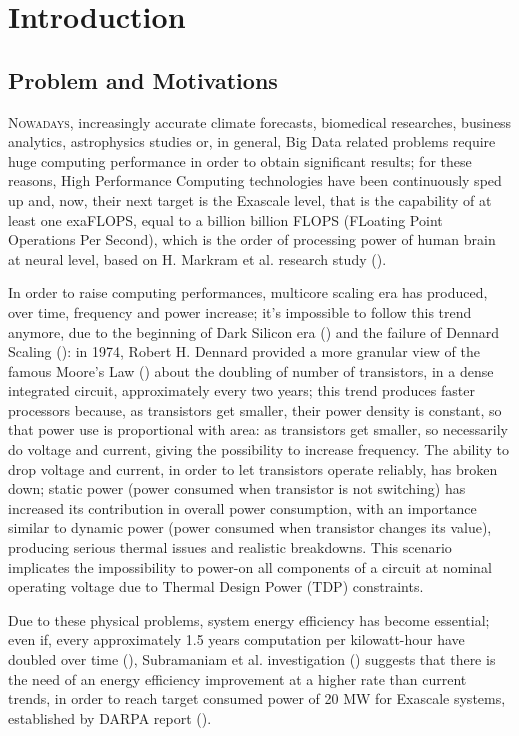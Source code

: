 \chapter{Introduction}

\section{Problem and Motivations}

\lettrine{N}{owadays}, increasingly accurate climate forecasts, biomedical researches, business analytics, astrophysics studies or, in general, Big Data related problems require huge computing performance in order to obtain significant results; for these reasons, High Performance Computing technologies have been continuously sped up and, now, their next target is the Exascale level, that is the capability of at least one exaFLOPS, equal to a billion billion FLOPS (FLoating Point Operations Per Second), which is the order of processing power of human brain at neural level, based on H. Markram et al. research study (\cite{markram2011introducing}).

In order to raise computing performances, multicore scaling era has produced, over time, frequency and power increase; it's impossible to follow this trend anymore, due to the beginning of Dark Silicon era (\cite{esmaeilzadeh2011dark}) and the failure of Dennard Scaling (\cite{dennard1974design}): in 1974, Robert H. Dennard provided a more granular view of the famous Moore's Law (\cite{moore1998cramming}) about the doubling of number of transistors, in a dense integrated circuit, approximately every two years; this trend produces faster processors because, as transistors get smaller, their power density is constant, so that power use is proportional with area: as transistors get smaller, so necessarily do voltage and current, giving the possibility to increase frequency. The ability to drop voltage and current, in order to let transistors operate reliably, has broken down; static power (power consumed when transistor is not switching) has increased its contribution in overall power consumption, with an importance similar to dynamic power (power consumed when transistor changes its value), producing serious thermal issues and realistic breakdowns. This scenario implicates the impossibility to power-on all components of a circuit at nominal operating voltage due to Thermal Design Power (TDP) constraints.

Due to these physical problems, system energy efficiency has become essential; even if, every approximately 1.5 years computation per kilowatt-hour have doubled over time (\cite{koomey2011implications}), Subramaniam et al. investigation (\cite{subramaniam2013trends}) suggests that there is the need of an energy efficiency improvement at a higher rate than current trends, in order to reach target consumed power of 20 MW for Exascale systems, established by DARPA report (\cite{bergman2008exascale}).

